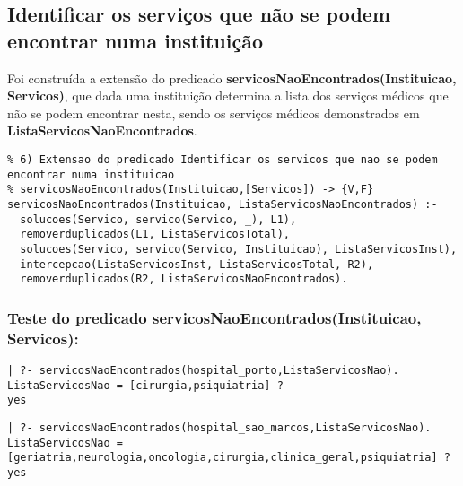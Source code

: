 \documentclass[
  oneside,
  10pt, a4paper,
  footinclude=true,
  headinclude=true,
  cleardoublepage=empty
]{scrbook}
\begin{document}
\subsection{Identificar os serviços que não se podem encontrar numa instituição}




Foi construída a extensão do predicado \textbf{servicosNaoEncontrados(Instituicao, Servicos)}, que dada uma instituição determina a lista dos serviços médicos que não se podem encontrar nesta, sendo os serviços médicos demonstrados em \textbf{ListaServicosNaoEncontrados}.\par 
\begin{lstlisting}
% 6) Extensao do predicado Identificar os servicos que nao se podem encontrar numa instituicao
% servicosNaoEncontrados(Instituicao,[Servicos]) -> {V,F}
servicosNaoEncontrados(Instituicao, ListaServicosNaoEncontrados) :-
  solucoes(Servico, servico(Servico, _), L1),
  removerduplicados(L1, ListaServicosTotal),
  solucoes(Servico, servico(Servico, Instituicao), ListaServicosInst),
  intercepcao(ListaServicosInst, ListaServicosTotal, R2),
  removerduplicados(R2, ListaServicosNaoEncontrados).
\end{lstlisting}


\subsubsection{Teste do predicado \textbf{servicosNaoEncontrados(Instituicao, Servicos)}:}

\begin{lstlisting}
| ?- servicosNaoEncontrados(hospital_porto,ListaServicosNao).
ListaServicosNao = [cirurgia,psiquiatria] ? 
yes
\end{lstlisting}

\begin{lstlisting}
| ?- servicosNaoEncontrados(hospital_sao_marcos,ListaServicosNao).
ListaServicosNao = [geriatria,neurologia,oncologia,cirurgia,clinica_geral,psiquiatria] ? 
yes
\end{lstlisting}
\end{document}
